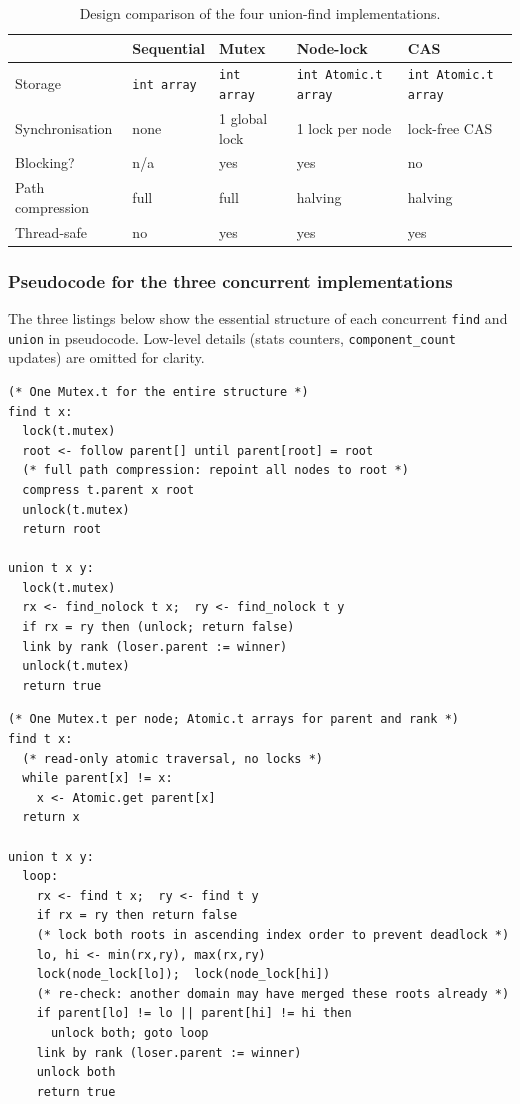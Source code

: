 \documentclass[11pt,a4paper]{article}
\begin{document}
\begin{table}[H]
\centering
\small
\begin{tabular}{@{}lllll@{}}
\toprule
 & Sequential & Mutex & Node-lock & CAS \\
\midrule
Storage & \texttt{int array} & \texttt{int array} & \texttt{int Atomic.t array} & \texttt{int Atomic.t array} \\
Synchronisation & none & 1 global lock & 1 lock per node & lock-free CAS \\
Blocking? & n/a & yes & yes & no \\
Path compression & full & full & halving & halving \\
Thread-safe & no & yes & yes & yes \\
\bottomrule
\end{tabular}
\caption{Design comparison of the four union-find implementations.}
\label{tab:impl-compare}
\end{table}

\subsubsection*{Pseudocode for the three concurrent implementations}

The three listings below show the essential structure of each concurrent
\texttt{find} and \texttt{union} in pseudocode.  Low-level details (stats
counters, \texttt{component\_count} updates) are omitted for clarity.

\begin{lstlisting}[caption={Global-mutex \texttt{find} and \texttt{union}.},label={lst:mutex-pseudo}]
(* One Mutex.t for the entire structure *)
find t x:
  lock(t.mutex)
  root <- follow parent[] until parent[root] = root
  (* full path compression: repoint all nodes to root *)
  compress t.parent x root
  unlock(t.mutex)
  return root

union t x y:
  lock(t.mutex)
  rx <- find_nolock t x;  ry <- find_nolock t y
  if rx = ry then (unlock; return false)
  link by rank (loser.parent := winner)
  unlock(t.mutex)
  return true
\end{lstlisting}

\begin{lstlisting}[caption={Per-node-lock \texttt{find} and \texttt{union}.},label={lst:nodelock-pseudo}]
(* One Mutex.t per node; Atomic.t arrays for parent and rank *)
find t x:
  (* read-only atomic traversal, no locks *)
  while parent[x] != x:
    x <- Atomic.get parent[x]
  return x

union t x y:
  loop:
    rx <- find t x;  ry <- find t y
    if rx = ry then return false
    (* lock both roots in ascending index order to prevent deadlock *)
    lo, hi <- min(rx,ry), max(rx,ry)
    lock(node_lock[lo]);  lock(node_lock[hi])
    (* re-check: another domain may have merged these roots already *)
    if parent[lo] != lo || parent[hi] != hi then
      unlock both; goto loop
    link by rank (loser.parent := winner)
    unlock both
    return true
\end{lstlisting}
\end{document}
